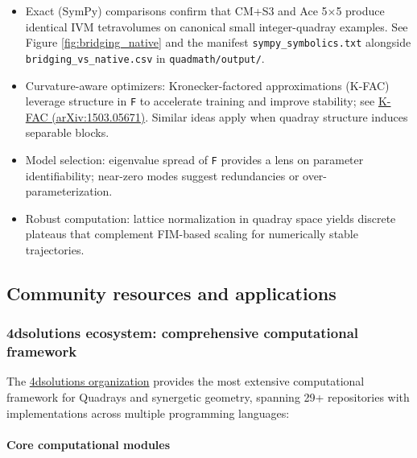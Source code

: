 \documentclass[
  10pt,
]{article}
\begin{document}
\begin{itemize}
\item
  Exact (SymPy) comparisons confirm that CM+S3 and Ace 5×5 produce
  identical IVM tetravolumes on canonical small integer-quadray
  examples. See Figure \ref{fig:bridging_native} and the manifest
  \texttt{sympy\_symbolics.txt} alongside
  \texttt{bridging\_vs\_native.csv} in \texttt{quadmath/output/}.
\item
  Curvature-aware optimizers: Kronecker-factored approximations (K-FAC)
  leverage structure in \texttt{F} to accelerate training and improve
  stability; see \href{https://arxiv.org/abs/1503.05671}{K-FAC
  (arXiv:1503.05671)}. Similar ideas apply when quadray structure
  induces separable blocks.
\item
  Model selection: eigenvalue spread of \texttt{F} provides a lens on
  parameter identifiability; near-zero modes suggest redundancies or
  over-parameterization.
\item
  Robust computation: lattice normalization in quadray space yields
  discrete plateaus that complement FIM-based scaling for numerically
  stable trajectories.
\end{itemize}

\hypertarget{community-resources-and-applications}{%
\subsection{Community resources and
applications}\label{community-resources-and-applications}}

\hypertarget{dsolutions-ecosystem-comprehensive-computational-framework}{%
\subsubsection{4dsolutions ecosystem: comprehensive computational
framework}\label{dsolutions-ecosystem-comprehensive-computational-framework}}

The \href{https://github.com/4dsolutions}{4dsolutions organization}
provides the most extensive computational framework for Quadrays and
synergetic geometry, spanning 29+ repositories with implementations
across multiple programming languages:

\hypertarget{core-computational-modules}{%
\paragraph{Core computational
modules}\label{core-computational-modules}}
\end{document}
